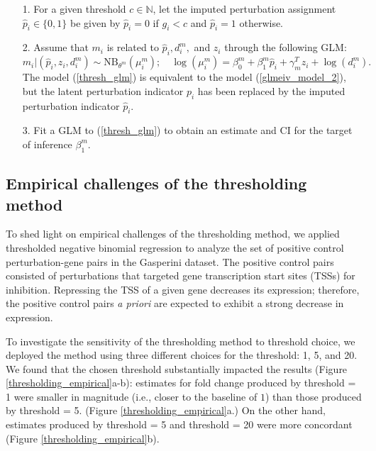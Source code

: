 \documentclass[12pt]{article}
\begin{document}
\begin{itemize}
	\item[1.] For a given threshold $c \in \mathbb{N}$, let the imputed perturbation assignment $\hat{p}_i \in \{0, 1\}$ be given by $\hat{p}_i = 0$ if  $g_i < c$ and $\hat{p}_i = 1$ otherwise.
	\item[2.] Assume that $m_i$ is related to $\hat{p}_i, d^m_i,$ and $z_i$ through the following GLM:
	\begin{equation}\label{thresh_glm}
	m_i | (\hat{p}_i, z_i, d^m_i) \sim \textrm{NB}_{\theta^m}(\mu^m_i); \quad
	\log(\mu^m_i) = \beta^m_0 + \beta^m_1 \hat{p}_i + \gamma^T_m z_i + \log\left(d_i^m\right).
	\end{equation}
	The model (\ref{thresh_glm}) is equivalent to the model (\ref{glmeiv_model_2}), but the latent perturbation indicator $p_i$ has been replaced by the imputed perturbation indicator $\hat{p}_i.$
	
	\item[3.] Fit a GLM to (\ref{thresh_glm}) to obtain an estimate and CI for the target of inference $\beta^m_1$.
\end{itemize}

\subsection{Empirical challenges of the thresholding method}\label{sec:thresholding_empirical}
To shed light on empirical challenges of the thresholding method, we applied thresholded negative binomial regression to analyze the set of positive control perturbation-gene pairs in the Gasperini dataset. The positive control pairs consisted of perturbations that targeted gene transcription start sites (TSSs) for inhibition. Repressing the TSS of a given gene decreases its expression; therefore, the positive control pairs \textit{a priori} are expected to exhibit a strong decrease in expression.

To investigate the sensitivity of the thresholding method to threshold choice, we deployed the method using three different choices for the threshold: 1, 5, and 20. We found that the chosen threshold substantially impacted the results (Figure \ref{thresholding_empirical}a-b): estimates for fold change produced by threshold = 1 were smaller in magnitude (i.e., closer to the baseline of $1$) than those produced by threshold = 5. (Figure \ref{thresholding_empirical}a.) On the other hand, estimates produced by threshold = 5 and threshold = 20 were more concordant (Figure \ref{thresholding_empirical}b). 
\end{document}
